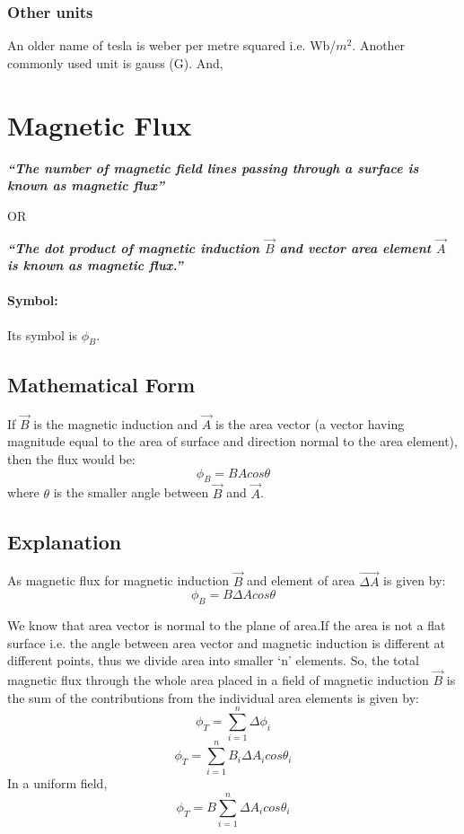 \subsubsection{Other units}
An older name of tesla is weber per metre squared i.e. Wb/$m^{2}$. Another commonly used unit is gauss (G).
And,


\section{Magnetic Flux}
\textit{\textbf{“The number of magnetic field lines passing through a surface
is known as magnetic flux”}}
\begin{center}
    OR
\end{center}
\textit{\textbf{“The dot product of magnetic induction $\vec{B}$ and vector
area element $\vec{A}$ is known as magnetic flux.”}}
\paragraph{Symbol:}
Its symbol is $\phi_{B}$.

\subsection{Mathematical Form}
If $\vec{B}$ is the magnetic induction and $\vec{A}$ is the area
vector (a vector having magnitude equal to the area of surface and
direction normal to the area element), then the flux would be:
\begin{equation}
  \phi_{B} = BA cos\theta \nonumber
\end{equation}
where $\theta$ is the smaller angle between $\vec{B}$ and $\vec{A}$.

\subsection{Explanation}
As magnetic flux for magnetic induction $\vec{B}$ and element of area $\vec{\Delta A}$ is given by:
\begin{equation}
  \phi_{B} = B\Delta A cos\theta \nonumber
\end{equation}

We know that area vector is normal to the plane of area.If the area is not
a flat surface i.e. the angle between area vector and magnetic induction is
different at different points, thus we divide area into smaller ‘n’ elements.
So, the total magnetic flux through the whole area placed in a field of magnetic
induction $\vec{B}$ is the sum of the contributions from the individual area
elements is given by:
\begin{equation}
 \phi_{T} =  \sum_{i=1}^{n} \Delta \phi_{i} \nonumber
\end{equation}
\begin{equation}
\phi_{T} =  \sum_{i=1}^{n} B_{i}\Delta A_{i}cos\theta_{i} \nonumber
\end{equation}
In a uniform field,
\begin{equation}
\phi_{T} = B \sum_{i=1}^{n} \Delta A_{i}cos\theta_{i} \nonumber  
\end{equation}

